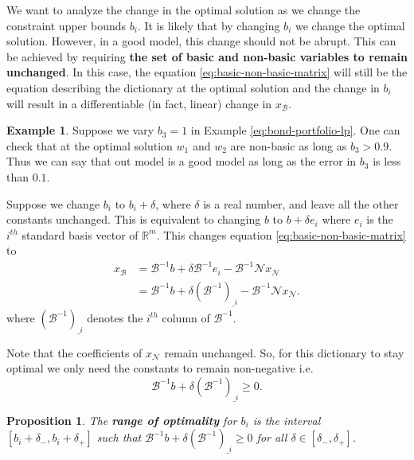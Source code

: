 \documentclass[
]{book}
\newtheorem{proposition}{Proposition}[chapter]
\theoremstyle{definition}
\theoremstyle{definition}
\newtheorem{example}{Example}[chapter]
\theoremstyle{definition}
\theoremstyle{definition}
\theoremstyle{remark}
\begin{document}
We want to analyze the change in the optimal solution as we change the constraint upper bounds \(b_i\).
It is likely that by changing \(b_i\) we change the optimal solution. However, in a good model, this
change should not be abrupt. This can be achieved by requiring \textbf{the set of basic and non-basic
variables to remain unchanged}. In this case, the equation \eqref{eq:basic-non-basic-matrix} will
still be the equation describing the dictionary at the optimal solution and the change in \(b_i\) will
result in a differentiable (in fact, linear) change in \(x_{\mathcal{B}}\).

\begin{example}
Suppose we vary \(b_3 = 1\) in Example \eqref{eq:bond-portfolio-lp}. One can check that at the optimal
solution \(w_1\) and \(w_2\) are non-basic as long as \(b_3 > 0.9\). Thus we can say that out model is a
good model as long as the error in \(b_3\) is less than \(0.1\).
\end{example}

Suppose we change \(b_i\) to \(b_i + \delta\), where \(\delta\) is a real number, and leave all the other
constants unchanged. This is equivalent to changing \(b\) to \(b + \delta e_i\) where \(e_i\) is the
\(i^{th}\) standard basis vector of \(\mathbb{R}^m\). This changes equation
\eqref{eq:basic-non-basic-matrix} to\\
\begin{align*}
  x_{\mathcal{B}} 
    &= \mathcal{B}^{-1} b + \delta \mathcal{B}^{-1} e_i - \mathcal{B}^{-1} \mathcal{N} x_{\mathcal{N}} \\
    &= \mathcal{B}^{-1} b + \delta (\mathcal{B}^{-1})_{\_i} - \mathcal{B}^{-1} \mathcal{N} x_{\mathcal{N}}.
\end{align*}
where \((\mathcal{B}^{-1})_{\_i}\) denotes the \(i^{th}\) column of \(\mathcal{B}^{-1}\).

Note that the coefficients of \(x_{\mathcal{N}}\) remain unchanged. So, for this dictionary to stay
optimal we only need the constants to remain non-negative i.e.
\begin{equation}
  \mathcal{B}^{-1} b + \delta (\mathcal{B}^{-1})_{\_i} \ge 0.
  \label{eq:range-of-optimality}
\end{equation}

\begin{proposition}
The \textbf{range of optimality} for \(b_i\) is the interval \([b_i + \delta_-, b_i + \delta_+]\) such that
\(\mathcal{B}^{-1} b + \delta (\mathcal{B}^{-1})_{\_i} \ge 0\) for all \(\delta \in [\delta_-, \delta_+]\).
\end{proposition}
\end{document}
